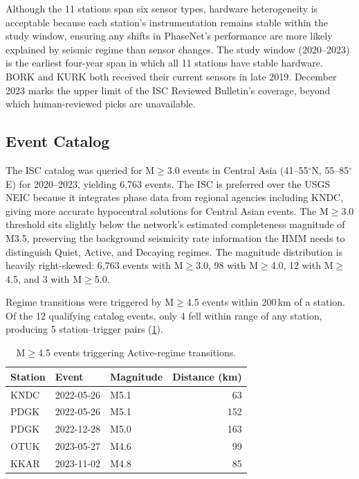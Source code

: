 Although the 11 stations span six sensor types, hardware heterogeneity is acceptable because each station's instrumentation remains stable within the study window, ensuring any shifts in PhaseNet's performance are more likely explained by seismic regime than sensor changes. The study window (2020--2023) is the earliest four-year span in which all 11 stations have stable hardware. BORK and KURK both received their current sensors in late 2019. December 2023 marks the upper limit of the ISC Reviewed Bulletin's coverage, beyond which human-reviewed picks are unavailable.

\subsection{Event Catalog}
\label{app:catalog}

The ISC catalog was queried for M$\geq$3.0 events in Central Asia (41--55$^\circ$N, 55--85$^\circ$E) for 2020--2023, yielding 6{,}763 events. The ISC is preferred over the USGS NEIC because it integrates phase data from regional agencies including KNDC, giving more accurate hypocentral solutions for Central Asian events. The M$\geq$3.0 threshold sits slightly below the network's estimated completeness magnitude of M3.5, preserving the background seismicity rate information the HMM needs to distinguish Quiet, Active, and Decaying regimes. The magnitude distribution is heavily right-skewed: 6{,}763 events with M$\geq$3.0, 98 with M$\geq$4.0, 12 with M$\geq$4.5, and 3 with M$\geq$5.0. 

\medskip
Regime transitions were triggered by M$\geq$4.5 events within 200\,km of a station.  Of the 12 qualifying catalog events, only 4 fell within range of any station, 
producing 5 station--trigger pairs (\cref{tab:triggers}).

\begin{table}[h]
    \centering
    \caption{M$\geq$4.5 events triggering Active-regime transitions.}
    \label{tab:triggers}
    \small
    \begin{tabular}{@{}lllr@{}}
        \toprule
        Station & Event & Magnitude & Distance (km) \\
        \midrule
        KNDC & 2022-05-26 & M5.1 & 63  \\
        PDGK & 2022-05-26 & M5.1 & 152 \\
        PDGK & 2022-12-28 & M5.0 & 163 \\
        OTUK & 2023-05-27 & M4.6 & 99  \\
        KKAR & 2023-11-02 & M4.8 & 85  \\
        \bottomrule
    \end{tabular}
\end{table}

